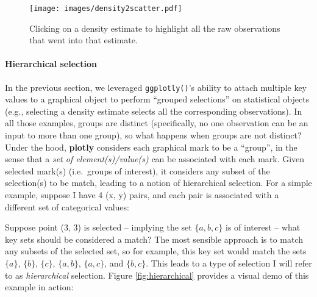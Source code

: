 \documentclass[12pt,]{isuthesis}
\newenvironment{Shaded}{\begin{snugshade}}{\end{snugshade}}
\newcommand{\KeywordTok}[1]{\textcolor[rgb]{0.13,0.29,0.53}{\textbf{{#1}}}}
\newcommand{\DataTypeTok}[1]{\textcolor[rgb]{0.13,0.29,0.53}{{#1}}}
\newcommand{\DecValTok}[1]{\textcolor[rgb]{0.00,0.00,0.81}{{#1}}}
\newcommand{\StringTok}[1]{\textcolor[rgb]{0.31,0.60,0.02}{{#1}}}
\newcommand{\CommentTok}[1]{\textcolor[rgb]{0.56,0.35,0.01}{\textit{{#1}}}}
\newcommand{\NormalTok}[1]{{#1}}
\let\oldparagraph\paragraph
\renewcommand{\paragraph}[1]{\oldparagraph{#1}\mbox{}}
\begin{document}
\begin{figure}
\centering
\texttt{[image: images/density2scatter.pdf]}
\caption{\label{fig:density2scatter}Clicking on a density estimate to
highlight all the raw observations that went into that estimate.}
\end{figure}

\paragraph{Hierarchical selection}\label{hierarchical-selection}

In the previous section, we leveraged \texttt{ggplotly()}'s ability to
attach multiple key values to a graphical object to perform ``grouped
selections'' on statistical objects (e.g., selecting a density estimate
selects all the corresponding observations). In all those examples,
groups are distinct (specifically, no one observation can be an input to
more than one group), so what happens when groups are not distinct?
Under the hood, \textbf{plotly} considers each graphical mark to be a
``group'', in the sense that a \emph{set of element(s)/value(s)} can be
associated with each mark. Given selected mark(s) (i.e.~groups of
interest), it considers any subset of the selection(s) to be match,
leading to a notion of hierarchical selection. For a simple example,
suppose I have 4 (x, y) pairs, and each pair is associated with a
different set of categorical values:

\begin{Shaded}
\end{Shaded}

Suppose point (3, 3) is selected -- implying the set \(\{ a, b, c \}\)
is of interest -- what key sets should be considered a match? The most
sensible approach is to match any subsets of the selected set, so for
example, this key set would match the sets \(\{ a \}\), \(\{ b \}\),
\(\{ c \}\), \(\{ a, b \}\), \(\{ a, c \}\), and \(\{ b, c \}\). This
leads to a type of selection I will refer to as \emph{hierarchical}
selection. Figure \ref{fig:hierarchical} provides a visual demo of this
example in action:
\end{document}
